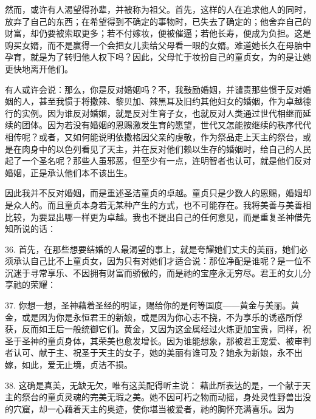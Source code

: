然而，或许有人渴望得孙辈，并被称为祖父。首先，这样的人在追求他人的同时，放弃了自己的东西；在希望得到不确定的事物时，已失去了确定的；他舍弃自己的财富，却仍要被索取更多；若不付嫁妆，便被催逼；若他长寿，便成为负担。这是购买女婿，而不是赢得一个会把女儿卖给父母看一眼的女婿。难道她长久在母胎中孕育，就是为了转归他人权下吗？因此，父母忙于妆扮自己的童贞女，为的是让她更快地离开他们。\par

有人或许会说：那么，你是反对婚姻吗？不，我鼓励婚姻，并谴责那些惯于反对婚姻的人，甚至我惯于将撒辣、黎贝加、辣黑耳及旧约其他妇女的婚姻，作为卓越德行的实例。因为谁反对婚姻，就是反对生育子女，也就反对人类通过世代相继而延续的团体。因为若没有婚姻的恩赐激发生育的愿望，世代又怎能按继续的秩序代代相传呢？或者，又如何能说明依撒格因父亲的虔敬，作为祭品走上天主的祭台，或是在肉身中的以色列看见了天主，并在反对他们赖以生存的婚姻时，给自己的人民起了一个圣名呢？那些人虽邪恶，但至少有一点，连明智者也认可，就是他们反对婚姻，正是承认他们本不该出生。\par

因此我并不反对婚姻，而是重述圣洁童贞的卓越。童贞只是少数人的恩赐，婚姻却是众人的。而且童贞本身若无某种产生的方式，也不可能存在。我将美善与美善相比较，为要显出哪一样更为卓越。我也不提出自己的任何意见，而是重复圣神借先知所说的话：\par

36. 首先，在那些想要结婚的人最渴望的事上，就是夸耀她们丈夫的美丽，她们必须承认自己比不上童贞女，因为只有对她们才适合说：那位净配是谁呢？是一位不沉迷于寻常享乐、不因拥有财富而骄傲的，而是祂的宝座永无穷尽。君王的女儿分享祂的荣耀：\par

37. 你想一想，圣神藉着圣经的明证，赐给你的是何等国度——黄金与美丽。黄金，或是因为你是永恒君王的新娘，或是因为你心志不挠，不为享乐的诱惑所俘获，反而如王后一般统御它们。黄金，又因为这金属经过火炼更加宝贵，同样，祝圣于圣神的童贞身体，其荣美也愈发增长。因为谁能想象，那被君王宠爱、被审判者认可、献于主、祝圣于天主的女子，她的美丽有谁可及？她永为新娘，永不出嫁，如此，爱无止境，贞洁不损。\par

38. 这确是真美，无缺无欠，唯有这美配得听主说： 藉此所表达的是，一个献于天主的祭台的童贞灵魂的完美无瑕之美。她不因可朽之物而动摇，身处灵性野兽出没的穴窟，却一心藉着天主的奥迹，使你堪当被爱者，祂的胸怀充满喜乐。因为\par

